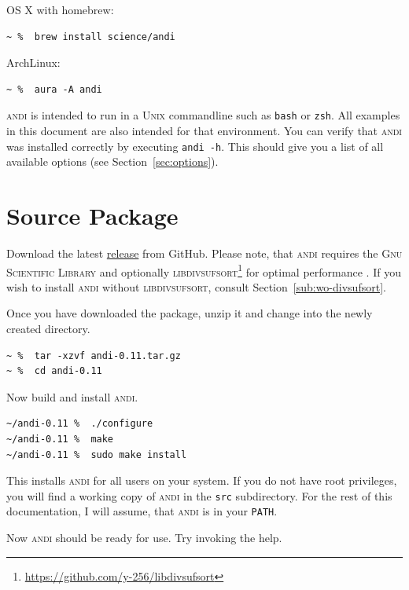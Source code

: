 \documentclass[a4paper,
  10pt,
  english,
  DIV=12,
  BCOR=8mm]{scrbook}
\newcommand{\algo}[1]{\textsc{{#1}}}
\newcommand{\andi}{\algo{andi}\xspace}
\begin{document}
\noindent OS X with homebrew:

\begin{lstlisting}
~ %  brew install science/andi
\end{lstlisting}

\noindent ArchLinux:

\begin{lstlisting}
~ %  aura -A andi
\end{lstlisting}

\andi is intended to run in a \algo{Unix} commandline such as \lstinline$bash$ or \lstinline$zsh$. All examples in this document are also intended for that environment. You can verify that \andi was installed correctly by executing \lstinline$andi -h$. This should give you a list of all available options (see Section~\ref{sec:options}).

\section{Source Package} \label{sub:regular}

Download the latest \href{https://github.com/EvolBioInf/andi/releases}{release} from GitHub. Please note, that \andi requires the \algo{Gnu Scientific Library} and optionally \algo{libdivsufsort}\footnote{\url{https://github.com/y-256/libdivsufsort}} for optimal performance \cite{divsufsort}. If you wish to install \andi without \algo{libdivsufsort}, consult Section~\ref{sub:wo-divsufsort}.

Once you have downloaded the package, unzip it and change into the newly created directory. 

\begin{lstlisting}
~ %  tar -xzvf andi-0.11.tar.gz
~ %  cd andi-0.11
\end{lstlisting}

\noindent Now build and install \andi.

\begin{lstlisting}
~/andi-0.11 %  ./configure
~/andi-0.11 %  make
~/andi-0.11 %  sudo make install
\end{lstlisting}

\noindent This installs \andi for all users on your system. If you do not have root privileges, you will find a working copy of \andi in the \lstinline$src$ subdirectory. For the rest of this documentation, I will assume, that \andi is in your \textdollar\lstinline!PATH!.

Now \andi should be ready for use. Try invoking the help.
\end{document}
